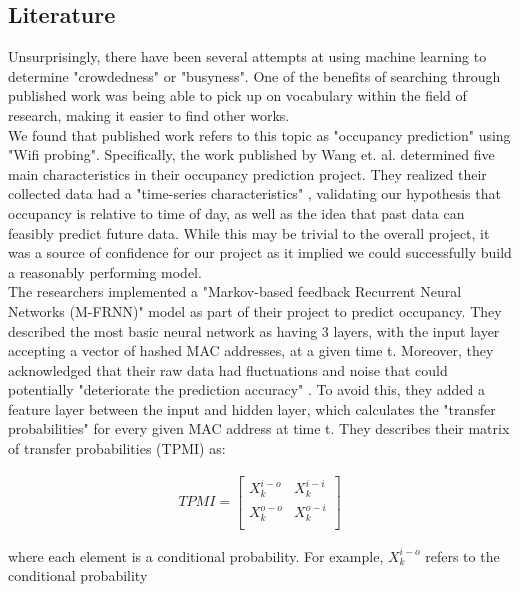 \documentclass[journal, 12pt]{IEEEtran}
\begin{document}
\subsection{Literature}

\noindent Unsurprisingly, there have been several attempts at using machine learning to determine "crowdedness" or "busyness". One of the benefits of searching through published work was being able to pick up on vocabulary within the field of research, making it easier to find other works. \\

\noindent We found that published work refers to this topic as "occupancy prediction" using "Wifi probing"\cite{wang2018occupancy}. Specifically, the work published by Wang et. al. determined five main characteristics in their occupancy prediction project. They realized their collected data had a "time-series characteristics" \cite{wang2018occupancy}, validating our hypothesis that occupancy is relative to time of day, as well as the idea that past data can feasibly predict future data. While this may be trivial to the overall project, it was a source of confidence for our project as it implied we could successfully build a reasonably performing model. \\

\noindent The researchers implemented a "Markov-based feedback Recurrent Neural
Networks (M-FRNN)" \cite{wang2018occupancy} model as part of their project to predict occupancy. They described the most basic neural network as having 3 layers, with the input layer accepting a vector of hashed MAC addresses, at a given time t. Moreover, they acknowledged that their raw data had fluctuations and noise that could potentially "deteriorate the prediction accuracy" \cite{wang2018occupancy}. To avoid this, they added a feature layer between the input and hidden layer, which calculates the "transfer probabilities" for every given MAC address at time t\cite{wang2018occupancy}. They describes their matrix of transfer probabilities (TPMI) as: 

\begin{gather}
 TPMI
 =
  \begin{bmatrix}
   X_{k}^{i-o} & X_{k}^{i-i}\\
   X_{k}^{o-o} & X_{k}^{o-i}\\
   \end{bmatrix}
\end{gather}

\noindent where each element is a conditional probability. For example, $X_{k}^{i-o}$ refers to the conditional probability 
\end{document}
